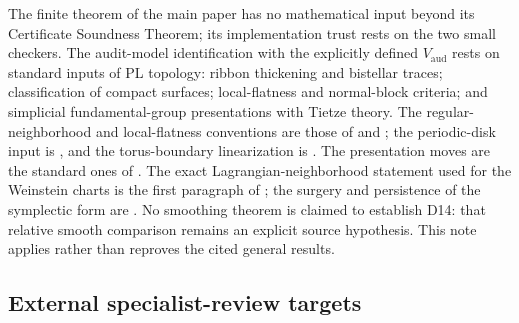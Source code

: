 \documentclass[11pt]{article}
\theoremstyle{definition}
\begin{document}
The finite theorem of the main paper has no mathematical input beyond
its Certificate Soundness Theorem; its implementation trust rests on the two
small checkers.  The audit-model identification with the explicitly defined
$V_{\mathrm{aud}}$ rests on standard inputs of PL topology: ribbon thickening and
bistellar traces; classification of compact surfaces; local-flatness and
normal-block criteria; and simplicial fundamental-group presentations with
Tietze theory.  The regular-neighborhood
and local-flatness conventions are those of
\cite[Chapters~2--4, especially pp.~50--51]{RourkeSanderson} and
\cite[Chapters~3--5]{Hudson}; the periodic-disk input is
\cite[Theorem~3.1 and Proposition~3.2]{ConstantinKolev}, and the torus-boundary
linearization is \cite[case~(IV), pp.~464--465]{HatcherLinearization}.  The
presentation moves are the standard ones of \cite{LyndonSchupp}.  The exact
Lagrangian-neighborhood statement used for the Weinstein charts is the
first paragraph of \cite[\S2.1]{ADK}; the surgery and persistence of the
symplectic form are \cite[Definition~2.1 and Proposition~2.2]{ADK}.  No smoothing theorem is claimed to
establish D14: that relative smooth comparison remains an explicit source
hypothesis.  This note applies rather than reproves the cited general results.

\subsection*{External specialist-review targets}
\end{document}

